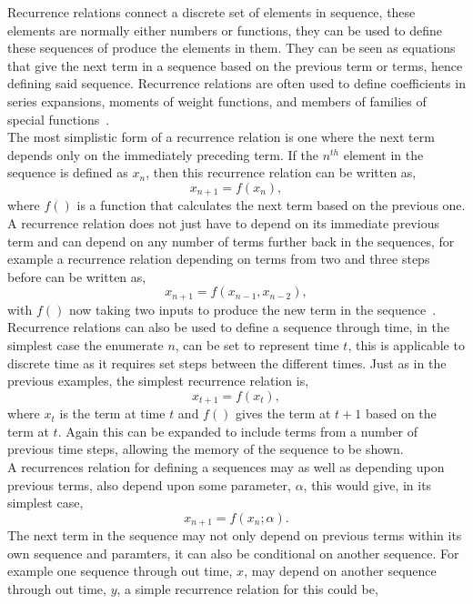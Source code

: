 \documentclass{article}
\begin{document}
Recurrence relations connect a discrete set of elements in sequence, these elements are normally either numbers or functions, they can be used to define these sequences of produce the elements in them. They can be seen as equations that give the next term in a sequence based on the previous term or terms, hence defining said sequence. Recurrence relations are often used to define coefficients in series expansions, moments of weight functions, and members of families of special functions~\cite{recurrelationbook}.\\
The most simplistic form of a recurrence relation is one where the next term depends only on the immediately preceding term. If the $n^{th}$ element in the sequence is defined as  $x_{n}$, then this recurrence relation can be written as,    
\begin{equation}
x_{n+1} = f(x_{n}),
\end{equation}
where $f()$ is a function that calculates the next term based on the previous one. A recurrence relation does not just have to depend on its immediate previous term and can depend on any number of terms further back in the sequences, for example a recurrence relation depending on terms from two and three steps before can be written as, 
\begin{equation}
x_{n+1} = f(x_{n-1}, x_{n-2}),
\end{equation}
with $f()$ now taking two inputs to produce the new term in the sequence~\cite{recurrealtionwebpage}.\\
Recurrence relations can also be used to define a sequence through time, in the simplest case the enumerate $n$, can be set to represent time $t$, this is applicable to discrete time as it requires set steps between the different times. Just as in the previous examples, the simplest recurrence relation is,  
\begin{equation}
x_{t+1} = f(x_{t}),
\end{equation}
where $x_{t}$ is the term at time $t$ and $f()$ gives the term at $t+1$ based on the term at $t$. Again this can be expanded to include terms from a number of previous time steps, allowing the memory of the sequence to be shown.\\  
A recurrences relation for defining a sequences may as well as depending upon previous terms, also depend upon some parameter, $\alpha$, this would give, in its simplest case, 
\begin{equation}
x_{n+1} = f(x_{n}; \alpha).
\end{equation}
The next term in the sequence may not only depend on previous terms within its own sequence and paramters, it can also be conditional on another sequence. For example one sequence through out time, $x$, may depend on another sequence through out time, $y$, a simple recurrence relation for this could be,
\end{document}
